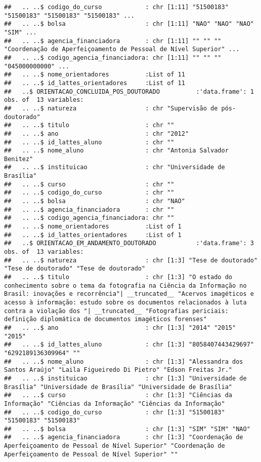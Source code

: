 \documentclass[]{article}
\begin{document}
\begin{verbatim}
##   .. ..$ codigo_do_curso            : chr [1:11] "51500183" "51500183" "51500183" "51500183" ...
##   .. ..$ bolsa                      : chr [1:11] "NAO" "NAO" "NAO" "SIM" ...
##   .. ..$ agencia_financiadora       : chr [1:11] "" "" "" "Coordenação de Aperfeiçoamento de Pessoal de Nível Superior" ...
##   .. ..$ codigo_agencia_financiadora: chr [1:11] "" "" "" "045000000000" ...
##   .. ..$ nome_orientadores          :List of 11
##   .. ..$ id_lattes_orientadores     :List of 11
##   ..$ ORIENTACAO_CONCLUIDA_POS_DOUTORADO          :'data.frame': 1 obs. of  13 variables:
##   .. ..$ natureza                   : chr "Supervisão de pós-doutorado"
##   .. ..$ titulo                     : chr ""
##   .. ..$ ano                        : chr "2012"
##   .. ..$ id_lattes_aluno            : chr ""
##   .. ..$ nome_aluno                 : chr "Antonia Salvador Benitez"
##   .. ..$ instituicao                : chr "Universidade de Brasília"
##   .. ..$ curso                      : chr ""
##   .. ..$ codigo_do_curso            : chr ""
##   .. ..$ bolsa                      : chr "NAO"
##   .. ..$ agencia_financiadora       : chr ""
##   .. ..$ codigo_agencia_financiadora: chr ""
##   .. ..$ nome_orientadores          :List of 1
##   .. ..$ id_lattes_orientadores     :List of 1
##   ..$ ORIENTACAO_EM_ANDAMENTO_DOUTORADO           :'data.frame': 3 obs. of  13 variables:
##   .. ..$ natureza                   : chr [1:3] "Tese de doutorado" "Tese de doutorado" "Tese de doutorado"
##   .. ..$ titulo                     : chr [1:3] "O estado do conhecimento sobre o tema da fotografia na Ciência da Informação no Brasil: inovações e recorrência"| __truncated__ "Acervos imagéticos e acesso à informação: estudo sobre os documentos relacionados à luta contra a violação dos "| __truncated__ "Fotografias periciais: definição diplomática de documentos imagéticos forenses"
##   .. ..$ ano                        : chr [1:3] "2014" "2015" "2015"
##   .. ..$ id_lattes_aluno            : chr [1:3] "8058407443429697" "6292189136309964" ""
##   .. ..$ nome_aluno                 : chr [1:3] "Alessandra dos Santos Araújo" "Laila Figueiredo Di Pietro" "Edson Freitas Jr."
##   .. ..$ instituicao                : chr [1:3] "Universidade de Brasília" "Universidade de Brasília" "Universidade de Brasília"
##   .. ..$ curso                      : chr [1:3] "Ciências da Informação" "Ciências da Informação" "Ciências da Informação"
##   .. ..$ codigo_do_curso            : chr [1:3] "51500183" "51500183" "51500183"
##   .. ..$ bolsa                      : chr [1:3] "SIM" "SIM" "NAO"
##   .. ..$ agencia_financiadora       : chr [1:3] "Coordenação de Aperfeiçoamento de Pessoal de Nível Superior" "Coordenação de Aperfeiçoamento de Pessoal de Nível Superior" ""

\end{verbatim}
\end{document}
